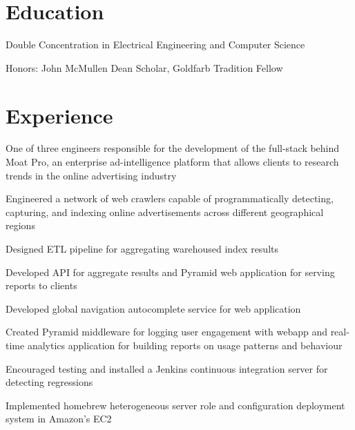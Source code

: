 \documentclass[]{deedy-resume-openfont}
\begin{document}
{}

\section{Education}
        \begin{tightemize}
        \item
            Double Concentration in Electrical Engineering and Computer Science
        \item
            Honors: John McMullen Dean Scholar, Goldfarb Tradition Fellow
        \end{tightemize}
\sectionsep

\section{Experience}

    \begin{tightemize}
        \item
            One of three engineers responsible for the development of the
            full-stack behind Moat Pro, an enterprise ad-intelligence platform
            that allows clients to research trends in the online advertising
            industry
        \item
            Engineered a network of web crawlers capable of programmatically
            detecting, capturing, and indexing online advertisements across
            different geographical regions
        \item
            Designed ETL pipeline for aggregating warehoused index results
        \item
            Developed API for aggregate results and Pyramid web application for
            serving reports to clients
        \item
            Developed global navigation autocomplete service for web application
        \item
            Created Pyramid middleware for logging user engagement with
            webapp and real-time analytics application for building reports on
            usage patterns and behaviour
        \item
            Encouraged testing and installed a Jenkins continuous integration
            server for detecting regressions
        \item
            Implemented homebrew heterogeneous server role and configuration
            deployment system in Amazon’s EC2
    \end{tightemize}
\sectionsep
\end{document}
